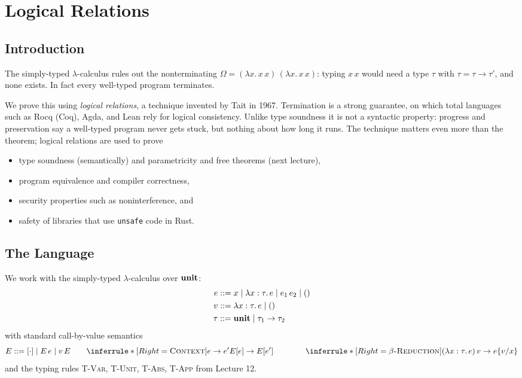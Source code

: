 % 
\chapter{Logical Relations}
 
\section{Introduction}
 
The simply-typed $\lambda$-calculus rules out the nonterminating
$\Omega = (\lambda x.\, x\,x)\,(\lambda x.\, x\,x)$: typing $x\,x$ would need a type
$\tau$ with $\tau = \tau \to \tau'$, and none exists. In fact every well-typed program
terminates.
 
 
We prove this using \emph{logical relations}, a technique invented by Tait in 1967.
Termination is a strong guarantee, on which total languages such as Rocq (Coq), Agda,
and Lean rely for logical consistency. Unlike type soundness it is not a syntactic
property: progress and preservation say a well-typed program never gets stuck, but
nothing about how long it runs. The technique matters even more than the theorem;
logical relations are used to prove
\begin{itemize}
  \item type soundness (semantically) and parametricity and free theorems (next lecture),
  \item program equivalence and compiler correctness,
  \item security properties such as noninterference, and
  \item safety of libraries that use \texttt{unsafe} code in Rust.
\end{itemize}
 
\section{The Language}
 
We work with the simply-typed $\lambda$-calculus over $\mathbf{unit}$:
\begin{align*}
e &::= x \mid \lambda x : \tau.\, e \mid e_1\, e_2 \mid () \\
v &::= \lambda x : \tau.\, e \mid () \\
\tau &::= \mathbf{unit} \mid \tau_1 \to \tau_2
\end{align*}
with standard call-by-value semantics
\[
E ::= [\cdot] \mid E\, e \mid v\, E
\qquad
\inferrule*[Right=\textsc{Context}]
  {e \to e'}
  {E[e] \to E[e']}
\qquad \qquad
\inferrule*[Right=\textsc{$\beta$-Reduction}]
  { }
  {(\lambda x : \tau.\, e)\, v \to \tsub{e}{v}{x}}
\]
and the typing rules \textsc{T-Var}, \textsc{T-Unit}, \textsc{T-Abs}, \textsc{T-App}
from Lecture 12.
 
